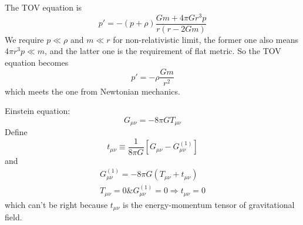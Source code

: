 \documentclass{article}
\begin{document}
The TOV equation is
$$p'=-(p+\rho)\frac{Gm+4\pi Gr^3p}{r(r-2Gm)}$$
We require $p\ll\rho$ and $m\ll r$ for non-relativistic limit, the former one also means $4\pi r^3p\ll m$, and the latter one is the requirement of flat metric. So the TOV equation becomes
$$p'=-\rho\frac{Gm}{r^2}$$
which meets the one from Newtonian mechanics.



Einstein equation:
$$G_{\mu\nu}=-8\pi GT_{\mu\nu}$$
Define
$$t_{\mu\nu}\equiv\frac{1}{8\pi G}[G_{\mu\nu}-G^{(1)}_{\mu\nu}]$$
and
\begin{align*}
  G^{(1)}_{\mu\nu}=-8\pi G(T_{\mu\nu}+t_{\mu\nu})\\
  T_{\mu\nu}=0\&G^{(1)}_{\mu\nu}=0\Longrightarrow t_{\mu\nu}=0
\end{align*}
which can't be right because $t_{\mu\nu}$ is the energy-momentum tensor of gravitational field.
\end{document}
